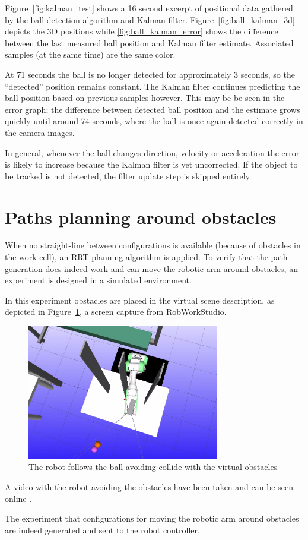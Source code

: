 Figure~\ref{fig:kalman_test} shows a 16 second excerpt of positional data gathered by the ball detection algorithm and Kalman filter.
Figure~\ref{fig:ball_kalman_3d} depicts the 3D positions while \ref{fig:ball_kalman_error} shows the difference between the last measured ball position and Kalman filter estimate. Associated samples (at the same time) are the same color.

At 71 seconds the ball is no longer detected for approximately 3 seconds, so the ``detected'' position remains constant. The Kalman filter continues predicting the ball position based on previous samples however. This may be be seen in the error graph; the difference between detected ball position and the estimate grows quickly until around 74 seconds, where the ball is once again detected correctly in the camera images.

In general, whenever the ball changes direction, velocity or acceleration the error is likely to increase because the Kalman filter is yet uncorrected. If the object to be tracked is not detected, the filter update step is skipped entirely.


\section{Paths planning around obstacles}
When no straight-line between configurations is available (because of obstacles in the work cell), an RRT planning algorithm is applied.
To verify that the path generation does indeed work and can move the robotic arm around obstacles, an experiment is designed in a simulated environment.

In this experiment obstacles are placed in the virtual scene description, as depicted in Figure~\ref{fig:collision_avoidance}, a screen capture from RobWorkStudio.

\begin{figure}[htb]
    \centering
    \includegraphics[width=0.75\textwidth]{figures/collision_avoidance}
    \caption{The robot follows the ball avoiding collide with the virtual obstacles}
    \label{fig:collision_avoidance}
\end{figure}

A video with the robot avoiding the obstacles have been taken and can be seen online \cite{results2}.

The experiment that configurations for moving the robotic arm around obstacles are indeed generated and sent to the robot controller.

